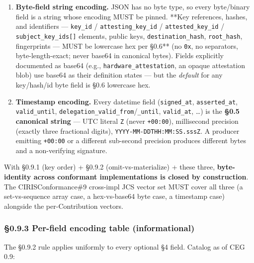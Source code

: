 \documentclass[11pt]{article}
\begin{document}
\begin{enumerate}\setlength\itemsep{0pt}
\item \textbf{Byte-field string encoding.} JSON has no byte type, so every byte/binary field is a string whose encoding MUST be pinned. **Key references, hashes, and identifiers — \texttt{key\_id} / \texttt{attesting\_key\_id} / \texttt{attested\_key\_id} / \texttt{subject\_key\_ids[]} elements, public keys, \texttt{destination\_hash}, \texttt{root\_hash}, fingerprints — MUST be lowercase hex per §0.6** (no \texttt{0x}, no separators, byte-length-exact; never base64 in canonical bytes). Fields explicitly documented as base64 (e.g., \texttt{hardware\_attestation}, an opaque attestation blob) use base64 as their definition states — but the \textit{default} for any key/hash/id byte field is §0.6 lowercase hex.
\item \textbf{Timestamp encoding.} Every datetime field (\texttt{signed\_at}, \texttt{asserted\_at}, \texttt{valid\_until}, \texttt{delegation\_valid\_from}/\texttt{\_until}, \texttt{valid\_at}, …) is the \textbf{§0.5 canonical string} — UTC literal \texttt{Z} (never \texttt{+00:00}), millisecond precision (exactly three fractional digits), \texttt{YYYY-MM-DDTHH:MM:SS.sssZ}. A producer emitting \texttt{+00:00} or a different sub-second precision produces different bytes and a non-verifying signature.
\end{enumerate}


With §0.9.1 (key order) + §0.9.2 (omit-vs-materialize) + these three, \textbf{byte-identity across conformant implementations is closed by construction}. The CIRISConformance\#9 cross-impl JCS vector set MUST cover all three (a set-vs-sequence array case, a hex-vs-base64 byte case, a timestamp case) alongside the per-Contribution vectors.


\subsubsection*{§0.9.3 Per-field encoding table (informational)}


The §0.9.2 rule applies uniformly to every optional §4 field. Catalog as of CEG 0.9:
\end{document}
